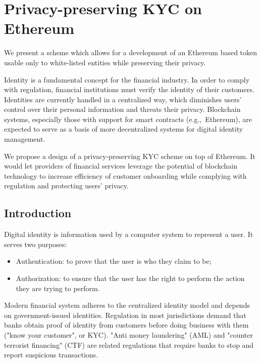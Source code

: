 \chapter{Privacy-preserving KYC on Ethereum}

\label{Chapter12KYC}

We present a scheme which allows for a development of an Ethereum based token usable only to white-listed entities while preserving their privacy.

Identity is a fundamental concept for the financial industry.
In order to comply with regulation, financial institutions must verify the identity of their customers.
Identities are currently handled in a centralized way, which diminishes users' control over their personal information and threats their privacy.
Blockchain systems, especially those with support for smart contracts (e.g.,~Ethereum), are expected to serve as a basis of more decentralized systems for digital identity management.

We propose a design of a privacy-preserving KYC scheme on top of Ethereum.
It would let providers of financial services leverage the potential of blockchain technology to increase efficiency of customer onboarding while complying with regulation and protecting users' privacy.



\section{Introduction}

Digital identity is information used by a computer system to represent a user.
It serves two purposes:

\begin{itemize}
	\item Authentication: to prove that the user is who they claim to be;
	\item Authorization: to ensure that the user has the right to perform the action they are trying to perform.
\end{itemize}

Modern financial system adheres to the centralized identity model and depends on government-issued identities.
Regulation in most jurisdictions demand that banks obtain proof of identity from customers before doing business with them ("know your customer", or KYC).
"Anti money laundering" (AML) and "counter terrorist financing" (CTF) are related regulations that require banks to stop and report suspicious transactions.

